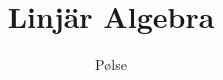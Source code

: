 \documentclass{article}
\title{Linjär Algebra}
\author{Pølse}
\begin{document}
\maketitle
\tableofcontents
\pagebreak









\end{document}
